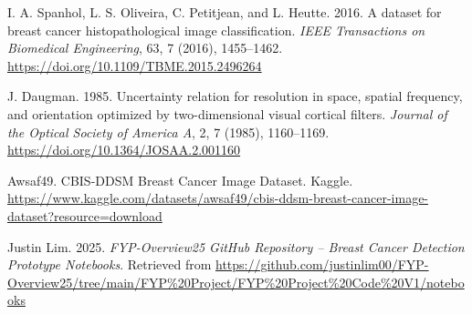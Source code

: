 \documentclass[12pt]{article}
\begin{document}
\begin{thebibliography}{99}
    I. A. Spanhol, L. S. Oliveira, C. Petitjean, and L. Heutte. 2016. A dataset for breast cancer histopathological image classification. \textit{IEEE Transactions on Biomedical Engineering}, 63, 7 (2016), 1455–1462. \url{https://doi.org/10.1109/TBME.2015.2496264}

    J. Daugman. 1985. Uncertainty relation for resolution in space, spatial frequency, and orientation optimized by two-dimensional visual cortical filters. \textit{Journal of the Optical Society of America A}, 2, 7 (1985), 1160–1169. \url{https://doi.org/10.1364/JOSAA.2.001160}

    Awsaf49. CBIS-DDSM Breast Cancer Image Dataset. Kaggle. \url{https://www.kaggle.com/datasets/awsaf49/cbis-ddsm-breast-cancer-image-dataset?resource=download}

    Justin Lim. 2025. \textit{FYP-Overview25 GitHub Repository – Breast Cancer Detection Prototype Notebooks}. Retrieved from \url{https://github.com/justinlim00/FYP-Overview25/tree/main/FYP%20Project/FYP%20Project%20Code%20V1/notebooks}
    
    \end{thebibliography}
    
\end{document}
